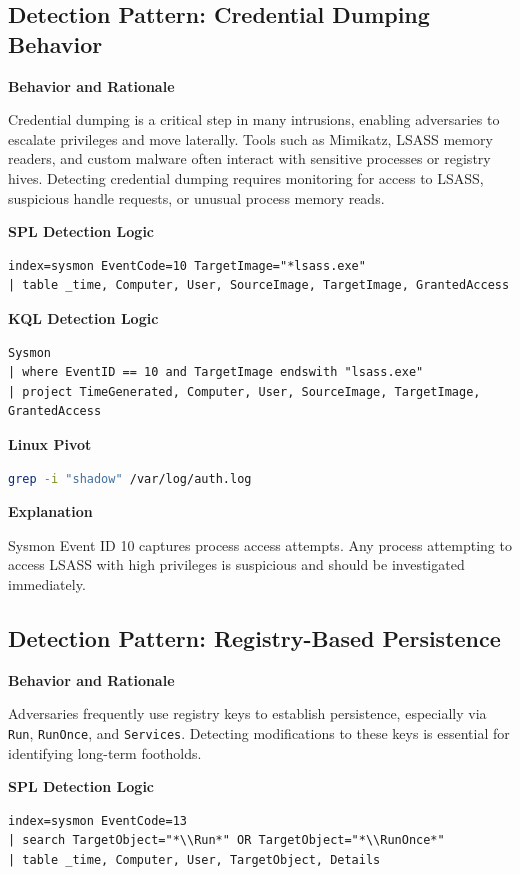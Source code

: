 \subsection*{Detection Pattern: Credential Dumping Behavior}

\textbf{Behavior and Rationale}

Credential dumping is a critical step in many intrusions, enabling adversaries to escalate privileges and move laterally. 
Tools such as Mimikatz, LSASS memory readers, and custom malware often interact with sensitive processes or registry hives. 
Detecting credential dumping requires monitoring for access to LSASS, suspicious handle requests, or unusual process memory reads.

\textbf{SPL Detection Logic}
\begin{lstlisting}
index=sysmon EventCode=10 TargetImage="*lsass.exe"
| table _time, Computer, User, SourceImage, TargetImage, GrantedAccess
\end{lstlisting}

\textbf{KQL Detection Logic}
\begin{lstlisting}
Sysmon
| where EventID == 10 and TargetImage endswith "lsass.exe"
| project TimeGenerated, Computer, User, SourceImage, TargetImage, GrantedAccess
\end{lstlisting}

\textbf{Linux Pivot}
\begin{lstlisting}[language=bash]
grep -i "shadow" /var/log/auth.log
\end{lstlisting}

\textbf{Explanation}

Sysmon Event ID 10 captures process access attempts. Any process attempting to access LSASS with high privileges is 
suspicious and should be investigated immediately.

\subsection*{Detection Pattern: Registry-Based Persistence}

\textbf{Behavior and Rationale}

Adversaries frequently use registry keys to establish persistence, especially via \texttt{Run}, \texttt{RunOnce}, 
and \texttt{Services}. Detecting modifications to these keys is essential for identifying long-term footholds.

\textbf{SPL Detection Logic}
\begin{lstlisting}
index=sysmon EventCode=13
| search TargetObject="*\\Run*" OR TargetObject="*\\RunOnce*"
| table _time, Computer, User, TargetObject, Details
\end{lstlisting}

